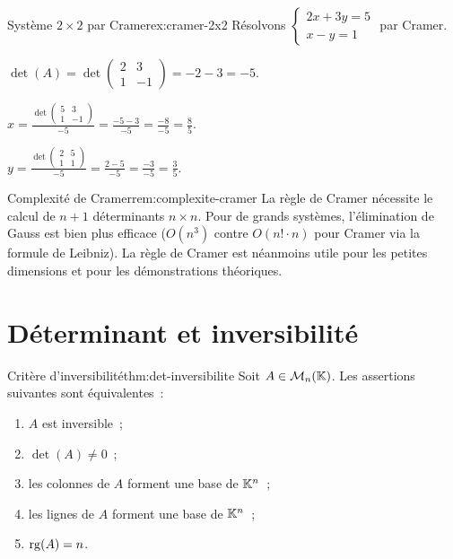 \begin{example}{Système $2\times 2$ par Cramer}{ex:cramer-2x2}
  Résolvons $\begin{cases}2x+3y=5\\x-y=1\end{cases}$ par Cramer.

  $\det(A)=\det\begin{pmatrix}2&3\\1&-1\end{pmatrix}=-2-3=-5$.

  $x=\frac{\det\begin{pmatrix}5&3\\1&-1\end{pmatrix}}{-5}
  =\frac{-5-3}{-5}=\frac{-8}{-5}=\frac{8}{5}$.

  $y=\frac{\det\begin{pmatrix}2&5\\1&1\end{pmatrix}}{-5}
  =\frac{2-5}{-5}=\frac{-3}{-5}=\frac{3}{5}$.
\end{example}

\begin{remark}{Complexité de Cramer}{rem:complexite-cramer}
  La règle de Cramer nécessite le calcul de $n+1$ déterminants
  $n\times n$. Pour de grands systèmes, l'élimination de Gauss est bien
  plus efficace ($O(n^3)$ contre $O(n!\cdot n)$ pour Cramer via la
  formule de Leibniz). La règle de Cramer est néanmoins utile pour les
  petites dimensions et pour les démonstrations théoriques.
\end{remark}

\section{Déterminant et inversibilité}\label{sec:det-inversibilite}

\begin{theorem}{Critère d'inversibilité}{thm:det-inversibilite}
  Soit $A\in\mathcal{M}_n({\mathbb{K}})$. Les assertions suivantes sont équivalentes~:
  \begin{enumerate}[label=(\roman*)]
    \item $A$ est inversible~;
    \item $\det(A)\neq 0$~;
    \item les colonnes de $A$ forment une base de ${\mathbb{K}}^n$~;
    \item les lignes de $A$ forment une base de ${\mathbb{K}}^n$~;
    \item $\operatorname{rg}(A)=n$.
  \end{enumerate}
\end{theorem}

